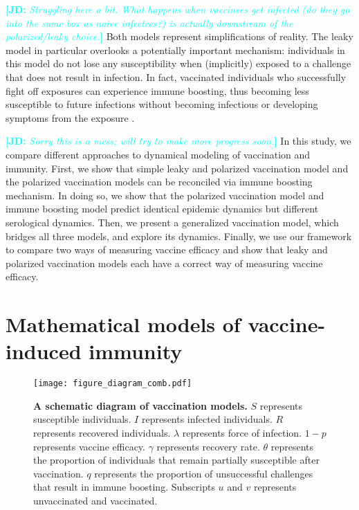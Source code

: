 \documentclass[12pt]{article}
\newcommand{\comment}{\showcomment}
\newcommand{\showcomment}[3]{\textcolor{#1}{\textbf{[#2: }\textsl{#3}\textbf{]}}}
\newcommand{\jd}[1]{\comment{cyan}{JD}{#1}}
\begin{document}
\jd{Struggling here a bit. What happens when vaccinees get infected (do they go into the same box as naive infectees?) is actually downstream of the polarized/leaky choice.}
Both models represent simplifications of reality.
The leaky model in particular overlooks a potentially important mechanism: individuals in this model do not lose any susceptibility when (implicitly) exposed to a challenge that does not result in infection. 
In fact, vaccinated individuals who successfully fight off exposures can experience immune boosting, thus becoming less susceptible to future infections without becoming infectious or developing symptoms from the exposure \citep{lavine2011natural,yang2020waning}.

\jd{Sorry this is a mess; will try to make more progress soon.}
In this study, we compare different approaches to dynamical modeling of vaccination and immunity.
First, we show that simple leaky and polarized vaccination model and the polarized vaccination models can be reconciled via immune boosting mechanism.
In doing so, we show that the polarized vaccination model and immune boosting model predict identical epidemic dynamics but different serological dynamics.
Then, we present a generalized vaccination model, which bridges all three models, and explore its dynamics.
Finally, we use our framework to compare two ways of measuring vaccine efficacy and show that leaky and polarized vaccination models each have a correct way of measuring vaccine efficacy.

\section*{Mathematical models of vaccine-induced immunity}

\begin{figure}[!th]
\texttt{[image: figure\_diagram\_comb.pdf]}
\caption{
\textbf{A schematic diagram of vaccination models.}
$S$ represents susceptible individuals. $I$ represents infected individuals. $R$ represents recovered individuals.
$\lambda$ represents force of infection. 
$1-p$ represents vaccine efficacy.
$\gamma$ represents recovery rate.
$\theta$ represents the proportion of individuals that remain partially susceptible after vaccination.
$q$ represents the proportion of unsuccessful challenges that result in immune boosting.
Subscripts $u$ and $v$ represents unvaccinated and vaccinated.
\label{fig:diagram}
}
\end{figure}
\end{document}
